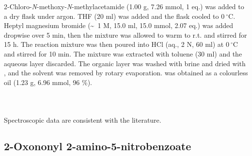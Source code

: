 2-Chloro-\textit{N}-methoxy-\textit{N}-methylacetamide  (1.00 g, 7.26 mmol, 1 eq.) was added to a dry flask under argon. THF (20 ml) was added and the flask cooled to $0\ ^{\circ}$C. Heptyl magnesium bromide  (\textasciitilde ~1 M, 15.0 ml, 15.0 mmol, 2.07 eq.) was added dropwise over 5 min, then the mixture was allowed to warm to r.t. and stirred for 15 h. The reaction mixture was then poured into HCl (aq., 2 N, 60 ml) at $0\ ^{\circ}$C and stirred for 10 min. The mixture was extracted with toluene (30 ml) and the aqueous layer discarded. The organic layer was washed with brine and dried with , and the solvent was removed by rotary evaporation.  was obtained as a colourless oil (1.23 g, 6.96 mmol, 96 \%).
\\[1\baselineskip]
\\[1\baselineskip]
\\[1\baselineskip]
\\[1\baselineskip]
Spectroscopic data are consistent with the literature\cite{Hodgkinson2011}.


\subsection{2-Oxononyl 2-amino-5-nitrobenzoate }

